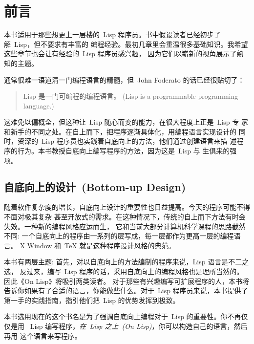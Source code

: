 
\chapter*{前言}
\label{chap:preface}

本书适用于那些想更上一层楼的~Lisp 程序员。书中假设读者已经初步了解~Lisp，但不要求有丰富的
编程经验。最初几章里会重温很多基础知识。我希望这些章节也会让有经验的~Lisp 程序员感兴趣，
因为它们以崭新的视角展示了熟知的主题。

通常很难一语道清一门编程语言的精髓，但~John
Foderato 的话已经很贴切了：

\begin{quote}
  Lisp 是一门可编程的编程语言。
  (Lisp is a programmable programming language.)
\end{quote}

这难免以偏概全，但这种让~Lisp 随心而变的能力，在很大程度上正是~Lisp 专
家和新手的不同之处。在自上而下，把程序逐渐具体化，用编程语言实现设计的
同时，资深的~Lisp 程序员也实践着自底向上的方法，他们通过创建语言来描
述程序的行为。本书教授自底向上编写程序的方法，因为这是~Lisp 与
生俱来的强项。

\section*{自底向上的设计~(Bottom-up Design)}
\label{sec:bottom-up_design}

随着软件复杂度的增长，自底向上设计的重要性也日益提高。今天的程序可能不得不面对极其复杂
甚至开放式的需求。在这种情况下，传统的自上而下方法有时会失效。一种新的编程风格应运而生，
它和当前大部分计算机科学课程的思路截然不同:
一个自底向上的程序由一系列的层写成，每一层都作为更高一层的编程语言。
X Window 和~\TeX{} 就是这种程序设计风格的典范。

本书有两层主题: 首先，对以自底向上的方法编制的程序来说，Lisp 语言是不二之选，
反过来，编写~Lisp 程序的话，采用自底向上的编程风格也是理所当然的。因此《On Lisp》将吸引两类读者。
对于那些有兴趣编写可扩展程序的人，本书将告诉你如果有了合适的语言，你能做些什么。对于~Lisp
程序员来说，本书提供了第一手的实践指南，指引他们把~Lisp 的优势发挥到极致。

本书选用现在的这个书名是为了强调自底向上编程对于~Lisp 的重要性。你不再仅仅是用
~Lisp 编写程序，\emph{在~Lisp 之上~(On Lisp)}，你可以构造自己的语言，然后再用
这个语言来写程序。

